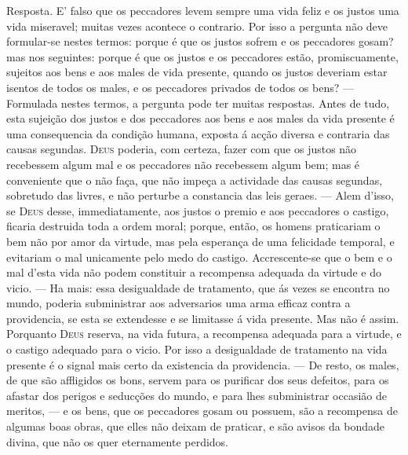 Resposta. E' falso que os peccadores levem sempre uma vida feliz e os justos uma vida miseravel; muitas vezes acontece o contrario. Por isso a pergunta não deve formular-se nestes termos: porque é que os justos sofrem e os peccadores gosam? mas nos seguintes: porque é que os justos e os peccadores estão, promiscuamente, sujeitos aos bens e aos males de vida presente, quando os justos deveriam estar isentos de todos os males, e os peccadores privados de todos os bens? --- Formulada nestes termos, a pergunta pode ter muitas respostas. Antes de tudo, esta sujeição dos justos e dos peccadores aos bens e aos males da vida presente é uma consequencia da condição humana, exposta á acção diversa e contraria das causas segundas. \textsc{Deus} poderia, com certeza, fazer com que os justos não recebessem algum mal e os peccadores não recebessem algum bem; mas é conveniente que o não faça, que não impeça a actividade das causas segundas, sobretudo das livres, e não perturbe a constancia das leis geraes. --- Alem d'isso, se \textsc{Deus} desse, immediatamente, aos justos o premio e aos peccadores o castigo, ficaria destruida toda a ordem moral; porque, então, os homens praticariam o bem não por amor da virtude, mas pela esperança de uma felicidade temporal, e evitariam o mal unicamente pelo medo do castigo. Accrescente-se que o bem e o mal d'esta vida não podem constituir a recompensa adequada da virtude e do vicio. --- Ha mais: essa desigualdade de tratamento, que ás vezes se encontra no mundo, poderia subministrar aos adversarios uma arma efficaz contra a providencia, se esta se extendesse e se limitasse á vida presente. Mas não é assim. Porquanto \textsc{Deus} reserva, na vida futura, a recompensa adequada para a virtude, e o castigo adequado para o vicio. Por isso a desigualdade de tratamento na vida presente é o signal mais certo da existencia da providencia. --- De resto, os males, de que são affligidos os bons, servem para os purificar dos seus defeitos, para os afastar dos perigos e seducções do mundo, e para lhes subministrar occasião de meritos, --- e os bens, que os peccadores gosam ou possuem, são a recompensa de algumas boas obras, que elles não deixam de praticar, e são avisos da bondade divina, que não os quer eternamente perdidos.

